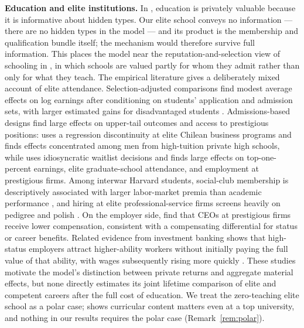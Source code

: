 \documentclass[12pt,letterpaper]{article}
\theoremstyle{definition}
\begin{document}
\textbf{Education and elite institutions.}
In \citet{spence1973signaling}, education is privately valuable because it is informative about hidden types.
Our elite school conveys no information --- there are no hidden types in the model --- and its product is the membership and qualification bundle itself; the mechanism would therefore survive full information.
This places the model near the reputation-and-selection view of schooling in \citet{macleodurquiola2019}, in which schools are valued partly for whom they admit rather than only for what they teach.
The empirical literature gives a deliberately mixed account of elite attendance.
Selection-adjusted comparisons find modest average effects on log earnings after conditioning on students' application and admission sets, with larger estimated gains for disadvantaged students \citep{dalekrueger2002}.
Admissions-based designs find large effects on upper-tail outcomes and access to prestigious positions: \citet{zimmerman2019elite} uses a regression discontinuity at elite Chilean business programs and finds effects concentrated among men from high-tuition private high schools, while \citet{chettydemingfriedman2026} uses idiosyncratic waitlist decisions and finds large effects on top-one-percent earnings, elite graduate-school attendance, and employment at prestigious firms.
Among interwar Harvard students, social-club membership is descriptively associated with larger labor-market premia than academic performance \citep{michelmanpricezimmerman2022}, and hiring at elite professional-service firms screens heavily on pedigree and polish \citep{rivera2015pedigree}.
On the employer side, \citet{fockemaugniessenruenzi2017} find that CEOs at prestigious firms receive lower compensation, consistent with a compensating differential for status or career benefits.
Related evidence from investment banking shows that high-status employers attract higher-ability workers without initially paying the full value of that ability, with wages subsequently rising more quickly \citep{bidwellwonbarbulescumollick2015}.
These studies motivate the model's distinction between private returns and aggregate material effects, but none directly estimates its joint lifetime comparison of elite and competent careers after the full cost of education.
We treat the zero-teaching elite school as a polar case; \citet{arteaga2018} shows curricular content matters even at a top university, and nothing in our results requires the polar case (Remark~\ref{rem:polar}).
\end{document}
